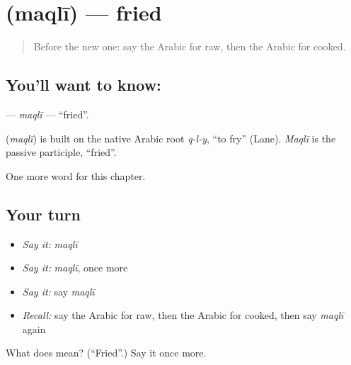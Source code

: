 \section[\texorpdfstring{\ar{مقلي} (maqlī)}{مقلي (maqlī)}]{ (maqlī) — fried}

\label{lesson:AR-C177-maqli}



\begin{quote}
Before the new one: say the Arabic for raw, then the Arabic for cooked.
\end{quote}

\subsection*{You'll want to know: }
\textbf{} — \emph{maqlī} — \textquotedblleft{}fried\textquotedblright{}.

\begin{cousinweb}
\textbf{} (\emph{maqlī}) is built on the native Arabic root \emph{q-l-y}, \textquotedblleft{}to fry\textquotedblright{} (Lane). \emph{Maqlī} is the passive participle, \textquotedblleft{}fried\textquotedblright{}.
\end{cousinweb}

\begin{grammarlens}[title={What you've built}]
One more word for this chapter.
\end{grammarlens}

\subsection*{Your turn}
\begin{itemize}
\raggedright
  \item \emph{Say it:} \emph{maqlī}
  \item \emph{Say it:} \emph{maqlī}, once more
  \item \emph{Say it:} say \emph{maqlī}
  \item \emph{Recall:} say the Arabic for raw, then the Arabic for cooked, then say \emph{maqlī} again
\end{itemize}

\begin{tcolorbox}[breakable,colback=teal!4,colframe=teal!35!black,title={Before you move on}]
What does  mean? (\textquotedblleft{}Fried\textquotedblright{}.) Say it once more.
\end{tcolorbox}
